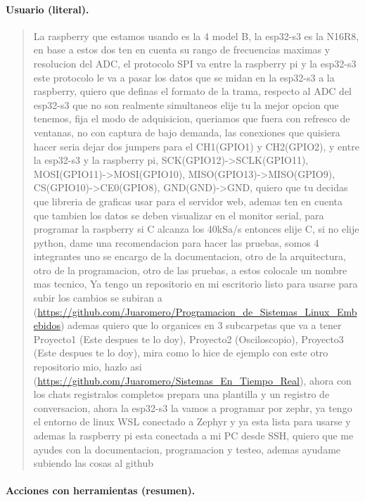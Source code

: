 \documentclass[12pt,a4paper]{article}
\begin{document}
\paragraph{Usuario (literal).}
\begin{quote}
La raspberry que estamos usando es la 4 model B, la esp32-s3 es la N16R8, en base a estos dos ten en cuenta su rango de frecuencias maximas y resolucion del ADC, el protocolo SPI va entre la raspberry pi y la esp32-s3 este protocolo le va a pasar los datos que se midan en la esp32-s3 a la raspberry, quiero que definas el formato de la trama, respecto al ADC del esp32-s3 que no son realmente simultaneos elije tu la mejor opcion que tenemos, fija el modo de adquisicion, queriamos que fuera con refresco de ventanas, no con captura de bajo demanda, las conexiones que quisiera hacer seria dejar dos jumpers para el CH1(GPIO1) y CH2(GPIO2), y entre la esp32-s3 y la raspberry pi, SCK(GPIO12)->SCLK(GPIO11), MOSI(GPIO11)->MOSI(GPIO10), MISO(GPIO13)->MISO(GPIO9), CS(GPIO10)->CE0(GPIO8), GND(GND)->GND, quiero que tu decidas que libreria de graficas usar para el servidor web, ademas ten en cuenta que tambien los datos se deben visualizar en el monitor serial, para programar la raspberry si C alcanza los 40kSa/s entonces elije C, si no elije python, dame una recomendacion para hacer las pruebas, somos 4 integrantes uno se encargo de la documentacion, otro de la arquitectura, otro de la programacion, otro de las pruebas, a estos colocale un nombre mas tecnico, Ya tengo un repositorio en mi escritorio listo para usarse para subir los cambios se subiran a (\url{https://github.com/Juaromero/Programacion_de_Sistemas_Linux_Embebidos}) ademas quiero que lo organices en 3 subcarpetas que va a tener Proyecto1 (Este despues te lo doy), Proyecto2 (Osciloscopio), Proyecto3 (Este despues te lo doy), mira como lo hice de ejemplo con este otro repositorio mio, hazlo asi (\url{https://github.com/Juaromero/Sistemas_En_Tiempo_Real}), ahora con los chats registralos completos prepara una plantilla y un registro de conversacion, ahora la esp32-s3 la vamos a programar por zephr, ya tengo el entorno de linux WSL conectado a Zephyr y ya esta lista para usarse y ademas la raspberry pi esta conectada a mi PC desde SSH, quiero que me ayudes con la documentacion, programacion y testeo, ademas ayudame subiendo las cosas al github
\end{quote}

\paragraph{Acciones con herramientas (resumen).}
\end{document}
